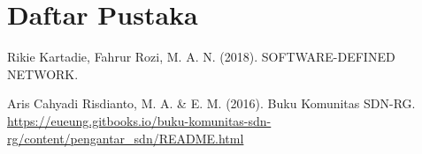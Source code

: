 \section{Daftar Pustaka}
Rikie Kartadie, Fahrur Rozi, M. A. N. (2018). SOFTWARE-DEFINED NETWORK.

Aris Cahyadi Risdianto, M. A. \& E. M. (2016). Buku Komunitas SDN-RG.
\url{https://eueung.gitbooks.io/buku-komunitas-sdn-rg/content/pengantar_sdn/README.html}
